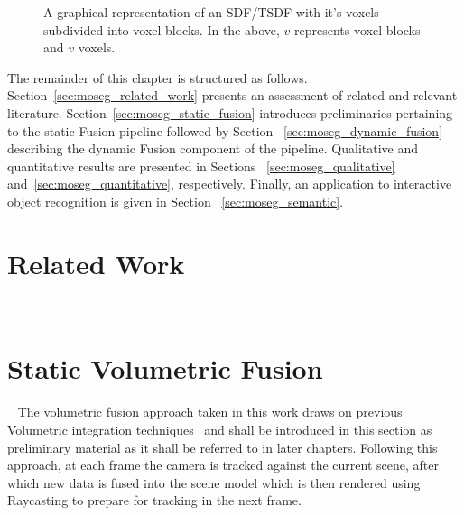 \begin{figure}[!htbp]
{
  }
  \caption[TSDF split in to voxel blocks]{A graphical representation of an 
  SDF/TSDF with it's voxels subdivided into voxel blocks. In the above, \(v\) 
  represents voxel blocks and \(v\) voxels.}
\end{figure}

The remainder of this chapter is structured as follows.
Section~\ref{sec:moseg_related_work} presents an assessment of related and
relevant literature. Section~\ref{sec:moseg_static_fusion} introduces
preliminaries pertaining to the static Fusion pipeline followed by Section
~\ref{sec:moseg_dynamic_fusion} describing the dynamic Fusion component of the
pipeline. Qualitative and quantitative results are presented in Sections
~\ref{sec:moseg_qualitative} and~\ref{sec:moseg_quantitative}, respectively.
Finally, an application to interactive object recognition is given in Section
~\ref{sec:moseg_semantic}.

\section{Related Work}
~\label{sec:moseg_related_work}

\section{Static Volumetric Fusion}
~\label{sec:moseg_static_fusion}
The volumetric fusion approach taken in this work draws on previous Volumetric
integration techniques~\cite{Curless1996, Newcombe2011, NieBner2013, Prisacariu2014} 
and shall be introduced in this section as preliminary material as it shall be
referred to in later chapters. Following this approach, at each frame the camera
is tracked against the current scene, after which new data is fused into the
scene model which is then rendered using Raycasting to prepare for tracking in
the next frame.

